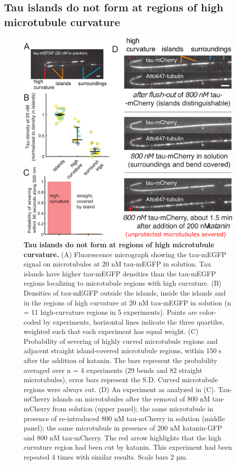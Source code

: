 \subsection{Tau islands do not form at regions of high microtubule curvature}
\begin{figure}[h!]
\centering
\includegraphics[scale=1]{Figures/tau7.png}
\caption[Tau islands do not form at regions of high microtubule curvature.]{
\textbf{Tau islands do not form at regions of high microtubule curvature.} (A) Fluorescence micrograph showing the tau-mEGFP signal on microtubules at 20 nM tau-mEGFP in solution. Tau islands have higher tau-mEGFP densities than the tau-mEGFP regions localizing to microtubule regions with high curvature. (B) Densities of tau-mEGFP outside the islands, inside the islands and in the regions of high curvature at 20 nM tau-mEGFP in solution (n = 11 high-curvature regions in 5 experiments). Points are color-coded by experiments, horizontal lines indicate the three quartiles, weighted such that each experiment has equal weight. (C) Probability of severing of highly curved microtubule regions and adjacent straight island-covered microtubule regions, within 150 s after the addition of katanin. The bars represent the probability averaged over n = 4 experiments (29 bends and 82 straight microtubules), error bars represent the S.D. Curved microtubule regions were always cut. (D) An experiment as analyzed in (C). Tau-mCherry islands on microtubules after the removal of 800 nM tau-mCherry from solution (upper panel); the same microtubule in presence of re-introduced 800 nM tau-mCherry in solution (middle panel); the same microtubule in presence of 200 nM katanin-GFP and 800 nM tau-mCherry. The red arrow highlights that the high curvature region  had been cut by katanin. This experiment had been repeated 4 times with similar results. Scale bars 2 µm.
	}\label{tau7}
\end{figure}

